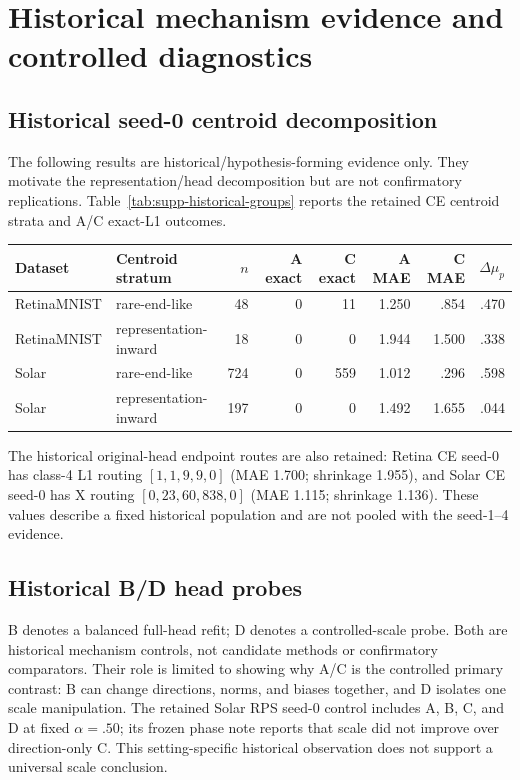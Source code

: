 \section{Historical mechanism evidence and controlled diagnostics}

\subsection{Historical seed-0 centroid decomposition}

The following results are historical/hypothesis-forming evidence only. They
motivate the representation/head decomposition but are not confirmatory
replications. Table~\ref{tab:supp-historical-groups} reports the retained CE
centroid strata and A/C exact-L1 outcomes.

\begin{center}
\begin{tabular}{llrrrrrr}
\toprule
Dataset & Centroid stratum & $n$ & A exact & C exact & A MAE & C MAE & $\Delta\mu_p$ \\
\midrule
RetinaMNIST & rare-end-like & 48 & 0 & 11 & 1.250 & .854 & .470 \\
RetinaMNIST & representation-inward & 18 & 0 & 0 & 1.944 & 1.500 & .338 \\
Solar & rare-end-like & 724 & 0 & 559 & 1.012 & .296 & .598 \\
Solar & representation-inward & 197 & 0 & 0 & 1.492 & 1.655 & .044 \\
\bottomrule
\end{tabular}
\label{tab:supp-historical-groups}
\end{center}

The historical original-head endpoint routes are also retained: Retina CE
seed-0 has class-4 L1 routing \([1,1,9,9,0]\) (MAE 1.700; shrinkage 1.955),
and Solar CE seed-0 has X routing \([0,23,60,838,0]\) (MAE 1.115;
shrinkage 1.136). These values describe a fixed historical population and are
not pooled with the seed-1--4 evidence.

\subsection{Historical B/D head probes}

B denotes a balanced full-head refit; D denotes a controlled-scale probe. Both
are historical mechanism controls, not candidate methods or confirmatory
comparators. Their role is limited to showing why A/C is the controlled primary
contrast: B can change directions, norms, and biases together, and D isolates
one scale manipulation. The retained Solar RPS seed-0 control includes A, B,
C, and D at fixed \(\alpha=.50\); its frozen phase note reports that scale did
not improve over direction-only C. This setting-specific historical observation
does not support a universal scale conclusion.

